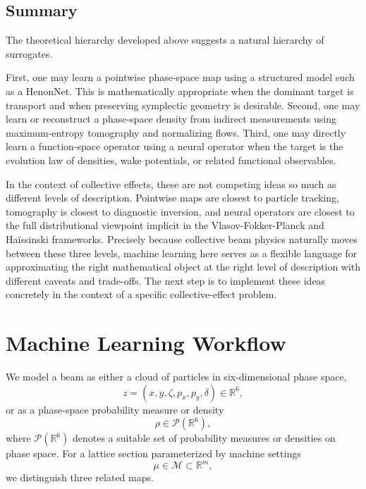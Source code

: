 \documentclass[11pt,a4paper]{article}
\begin{document}
\begin{sloppypar}
\subsection{Summary}
The theoretical hierarchy developed above suggests a natural hierarchy of surrogates.

First, one may learn a pointwise phase-space map using a structured model such as a HenonNet. This is mathematically appropriate when the dominant target is transport and when preserving symplectic geometry is desirable. Second, one may learn or reconstruct a phase-space density from indirect measurements using maximum-entropy tomography and normalizing flows. Third, one may directly learn a function-space operator using a neural operator when the target is the evolution law of densities, wake potentials, or related functional observables.

In the context of collective effects, these are not competing ideas so much as different levels of description. Pointwise maps are closest to particle tracking, tomography is closest to diagnostic inversion, and neural operators are closest to the full distributional viewpoint implicit in the Vlasov-Fokker-Planck and Ha\"issinski frameworks. Precisely because collective beam physics naturally moves between these three levels, machine learning here serves as a flexible language for approximating the right mathematical object at the right level of description with different caveats and trade-offs. The next step is to implement these ideas concretely in the context of a specific collective-effect problem.


\section{Machine Learning Workflow}


We model a beam as either a cloud of particles in six-dimensional phase space,
\begin{equation}
 z = (x,y,\zeta,p_x,p_y,\delta) \in \mathbb{R}^6,
\end{equation}
or as a phase-space probability measure or density
\begin{equation}
 \rho \in \mathcal{P}(\mathbb{R}^6),
\end{equation}
where $\mathcal{P}(\mathbb{R}^6)$ denotes a suitable set of probability measures or densities on phase space.
For a lattice section parameterized by machine settings
\begin{equation}
 \mu \in \mathcal{M} \subset \mathbb{R}^m,
\end{equation}
we distinguish three related maps.


\end{sloppypar}
\end{document}

